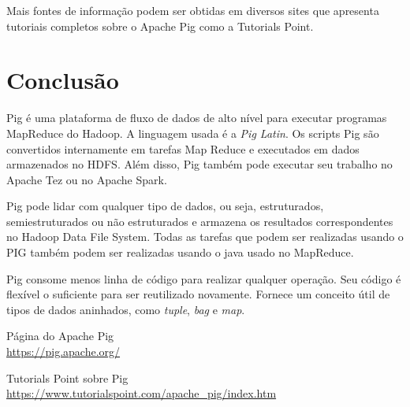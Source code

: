 \documentclass[a4paper,11pt]{article}
\begin{document}
Mais fontes de informação podem ser obtidas em diversos sites que apresenta tutoriais completos sobre o Apache Pig como a Tutorials Point\cite{tutorialspoint}.

\section{Conclusão}
Pig é uma plataforma de fluxo de dados de alto nível para executar programas MapReduce do Hadoop. A linguagem usada é a \textit{Pig Latin}. Os scripts Pig são convertidos internamente em tarefas Map Reduce e executados em dados armazenados no HDFS. Além disso, Pig também pode executar seu trabalho no Apache Tez ou no Apache Spark.

Pig pode lidar com qualquer tipo de dados, ou seja, estruturados, semiestruturados ou não estruturados e armazena os resultados correspondentes no Hadoop Data File System. Todas as tarefas que podem ser realizadas usando o PIG também podem ser realizadas usando o java usado no MapReduce. 

Pig consome menos linha de código para realizar qualquer operação. Seu código é flexível o suficiente para ser reutilizado novamente. Fornece um conceito útil de tipos de dados aninhados, como \textit{tuple}, \textit{bag} e \textit{map}.



\begin{thebibliography}{4}
	Página do Apache Pig \\
	\url{https://pig.apache.org/}

	Tutorials Point sobre Pig \\
	\url{https://www.tutorialspoint.com/apache_pig/index.htm}
	
	
\end{thebibliography}
\end{document}
